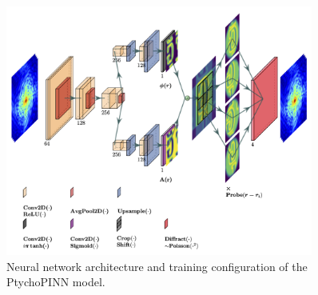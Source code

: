 \documentclass[sn-mathphys]{sn-jnl}%
\theoremstyle{thmstyleone}%
\theoremstyle{thmstyletwo}%
\theoremstyle{thmstylethree}%
\begin{document}


\begin{figure}[h]%
\centering
\includegraphics[width=0.9\textwidth]{figures/lett.png}
\caption{Neural network architecture and training configuration of the PtychoPINN model.}\label{diagram}
\end{figure}
\end{document}
